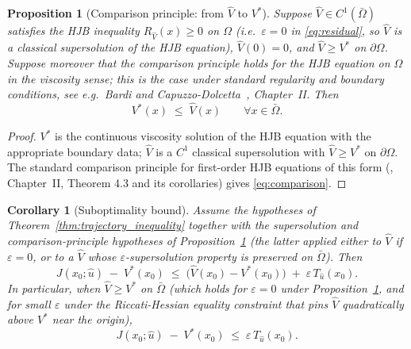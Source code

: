 \documentclass[11pt]{article}
\newtheorem{corollary}[theorem]{Corollary}
\newtheorem{proposition}[theorem]{Proposition}
\begin{document}
\begin{proposition}[Comparison principle: from $\hat V$ to $V^*$]
\label{prop:supersolution}
Suppose $\hat V \in C^1(\bar\Omega)$ satisfies the HJB inequality $R_{\hat V}(x) \geq 0$ on $\Omega$ (i.e.\ $\varepsilon = 0$ in \eqref{eq:residual}, so $\hat V$ is a classical supersolution of the HJB equation), $\hat V(0) = 0$, and $\hat V \geq V^*$ on $\partial \Omega$. Suppose moreover that the comparison principle holds for the HJB equation on $\Omega$ in the viscosity sense; this is the case under standard regularity and boundary conditions, see e.g.\ Bardi and Capuzzo-Dolcetta~\cite{bardi_dolcetta}, Chapter~II. Then
\begin{equation}
V^*(x) \;\leq\; \hat V(x) \qquad \forall x \in \bar\Omega.
\label{eq:comparison}
\end{equation}
\end{proposition}

\begin{proof}
$V^*$ is the continuous viscosity solution of the HJB equation with the appropriate boundary data; $\hat V$ is a $C^1$ classical supersolution with $\hat V \geq V^*$ on $\partial \Omega$. The standard comparison principle for first-order HJB equations of this form (\cite{bardi_dolcetta}, Chapter~II, Theorem 4.3 and its corollaries) gives \eqref{eq:comparison}.
\end{proof}

\begin{corollary}[Suboptimality bound]
\label{cor:control_suboptimality}
Assume the hypotheses of Theorem~\ref{thm:trajectory_inequality} together with the supersolution and comparison-principle hypotheses of Proposition~\ref{prop:supersolution} (the latter applied either to $\hat V$ if $\varepsilon=0$, or to a $\hat V$ whose $\varepsilon$-supersolution property is preserved on $\bar\Omega$). Then
\begin{equation}
J(x_0;\hat u) \;-\; V^*(x_0) \;\leq\; \bigl(\hat V(x_0) - V^*(x_0)\bigr) \;+\; \varepsilon\, T_{\hat u}(x_0).
\label{eq:cost_subopt}
\end{equation}
In particular, when $\hat V \geq V^*$ on $\bar\Omega$ (which holds for $\varepsilon=0$ under Proposition~\ref{prop:supersolution}, and for small $\varepsilon$ under the Riccati-Hessian equality constraint that pins $\hat V$ quadratically above $V^*$ near the origin),
\begin{equation}
J(x_0;\hat u) \;-\; V^*(x_0) \;\leq\; \varepsilon\, T_{\hat u}(x_0).
\label{eq:control_suboptimality}
\end{equation}
\end{corollary}
\end{document}
